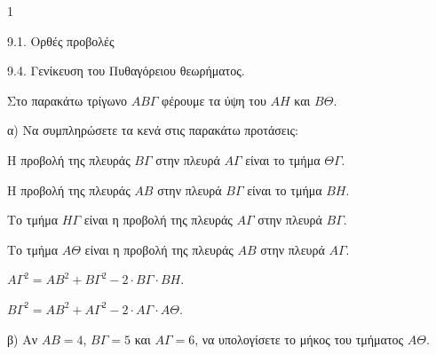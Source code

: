 \begin{ylh}{1}
    \item 9.1. Ορθές προβολές
    \item 9.4. Γενίκευση του Πυθαγόρειου θεωρήματος.
\end{ylh}
\begin{figure} %
\end{figure}

Στο παρακάτω τρίγωνο $ΑΒ\Gamma$ φέρουμε τα ύψη του $ΑΗ$ και $Β\Theta$.

\begin{alist}
\item α) Να συμπληρώσετε τα κενά στις παρακάτω προτάσεις:
  \begin{rlist}
  \item Η προβολή της πλευράς $Β\Gamma$ στην πλευρά $Α\Gamma$ είναι το τμήμα $\Theta\Gamma$.
  \item Η προβολή της πλευράς $ΑΒ$ στην πλευρά $Β\Gamma$ είναι το τμήμα $BH$.
  \item Το τμήμα $Η\Gamma$ είναι η προβολή της πλευράς $A\Gamma$ στην πλευρά $B\Gamma$.
  \item Το τμήμα $Α\Theta$ είναι η προβολή της πλευράς $AB$ στην πλευρά $A\Gamma$.
  \item $Α\Gamma^2 = ΑΒ^2 + Β\Gamma^2 - 2 \cdot Β\Gamma \cdot BH$.
  \item $Β\Gamma^2 = AB^2 + Α\Gamma^2 - 2 \cdot A\Gamma \cdot Α\Theta$. 
  \end{rlist}
\item β) Αν $ΑΒ = 4$, $Β\Gamma=5$ και $Α\Gamma = 6$, να υπολογίσετε το μήκος του τμήματος $Α\Theta$. 
\end{alist}